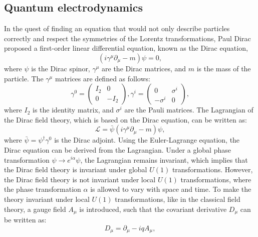     \subsection{Quantum electrodynamics}
        In the quest of finding an equation that would not only describe particles correctly
        and respect the symmetries of the Lorentz transformations, Paul Dirac proposed a first-order 
        linear differential equation, known as the Dirac equation,
        \begin{equation}
            (i\gamma^{\mu}\partial_{\mu} - m)\psi = 0,
        \end{equation}
        where $\psi$ is the Dirac spinor, $\gamma^{\mu}$ are the Dirac matrices, and $m$ is the mass of the particle.
        The $\gamma^{\mu}$ matrices are defined as follows:
        \begin{equation}
            \gamma^0 = \begin{pmatrix} I_2 & 0 \\ 0 & -I_2 \end{pmatrix},
            \gamma^i = \begin{pmatrix} 0 & \sigma^i \\ -\sigma^i & 0 \end{pmatrix},
        \end{equation}
        where $I_2$ is the identity matrix, and $\sigma^i$ are the Pauli matrices. 
        The Lagrangian of the Dirac field theory, which is based on the Dirac equation, can be written as:
        \begin{equation}
            \mathcal{L} = \bar{\psi}(i\gamma^{\mu}\partial_{\mu} - m)\psi,
        \end{equation}
        where $\bar{\psi} = \psi^{\dagger}\gamma^0$ is the Dirac adjoint. Using the Euler-Lagrange equation,
        the Dirac equation can be derived from the Lagrangian. 
        Under a global phase transformation $\psi \rightarrow e^{i\alpha}\psi$, the Lagrangian remains invariant,
        which implies that the Dirac field theory is invariant under global $U(1)$ transformations.
        However, the Dirac field theory is not invariant under local $U(1)$ transformations, where the phase
        transformation $\alpha$ is allowed to vary with space and time. To make the theory invariant under local
        $U(1)$ transformations, like in the classical field theory, a gauge field $A_{\mu}$ is introduced, 
        such that the covariant derivative $D_{\mu}$ can be written as:
        \begin{equation}
            D_{\mu} = \partial_{\mu} - iqA_{\mu},
        \end{equation}
